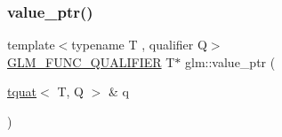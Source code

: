 \subsubsection{\texorpdfstring{value\+\_\+ptr()}{value\_ptr()}\hspace{0.1cm}{\footnotesize\ttfamily [27/27]}}
{\footnotesize\ttfamily template$<$typename T , qualifier Q$>$ \\
\hyperlink{setup_8hpp_a33fdea6f91c5f834105f7415e2a64407}{G\+L\+M\+\_\+\+F\+U\+N\+C\+\_\+\+Q\+U\+A\+L\+I\+F\+I\+ER} T$\ast$ glm\+::value\+\_\+ptr (\begin{DoxyParamCaption}\item[{\hyperlink{structglm_1_1tquat}{tquat}$<$ T, Q $>$ \&}]{q }\end{DoxyParamCaption})}

